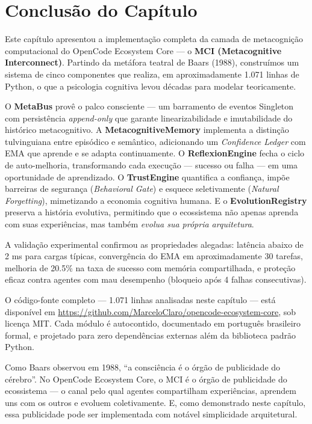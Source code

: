 \section{Conclusão do Capítulo}
\label{sec:conclusion}

Este capítulo apresentou a implementação completa da camada de metacognição computacional do OpenCode Ecosystem Core — o \textbf{MCI (Metacognitive Interconnect)}. Partindo da metáfora teatral de Baars (1988), construímos um sistema de cinco componentes que realiza, em aproximadamente 1.071 linhas de Python, o que a psicologia cognitiva levou décadas para modelar teoricamente.

O \textbf{MetaBus} provê o palco consciente — um barramento de eventos Singleton com persistência \textit{append-only} que garante linearizabilidade e imutabilidade do histórico metacognitivo. A \textbf{MetacognitiveMemory} implementa a distinção tulvinguiana entre episódico e semântico, adicionando um \textit{Confidence Ledger} com EMA que aprende e se adapta continuamente. O \textbf{ReflexionEngine} fecha o ciclo de auto-melhoria, transformando cada execução — sucesso ou falha — em uma oportunidade de aprendizado. O \textbf{TrustEngine} quantifica a confiança, impõe barreiras de segurança (\textit{Behavioral Gate}) e esquece seletivamente (\textit{Natural Forgetting}), mimetizando a economia cognitiva humana. E o \textbf{EvolutionRegistry} preserva a história evolutiva, permitindo que o ecossistema não apenas aprenda com suas experiências, mas também \textit{evolua sua própria arquitetura}.

A validação experimental confirmou as propriedades alegadas: latência abaixo de 2 ms para cargas típicas, convergência do EMA em aproximadamente 30 tarefas, melhoria de 20.5\% na taxa de sucesso com memória compartilhada, e proteção eficaz contra agentes com mau desempenho (bloqueio após 4 falhas consecutivas).

O código-fonte completo — 1.071 linhas analisadas neste capítulo — está disponível em \url{https://github.com/MarceloClaro/opencode-ecosystem-core}, sob licença MIT. Cada módulo é autocontido, documentado em português brasileiro formal, e projetado para zero dependências externas além da biblioteca padrão Python.

Como Baars observou em 1988, ``a consciência é o órgão de publicidade do cérebro''. No OpenCode Ecosystem Core, o MCI é o órgão de publicidade do ecossistema — o canal pelo qual agentes compartilham experiências, aprendem uns com os outros e evoluem coletivamente. E, como demonstrado neste capítulo, essa publicidade pode ser implementada com notável simplicidade arquitetural.


